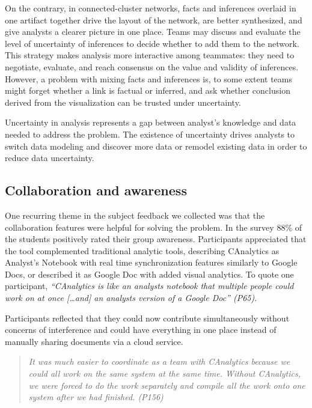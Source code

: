 

On the contrary, in connected-cluster networks, facts and inferences overlaid in one artifact together drive the layout of the
network, are better synthesized, and give analysts a clearer picture in one place. Teams may discuss and evaluate the level of uncertainty of inferences to decide whether to add them to the
network. This strategy makes analysis more interactive among teammates:
they need to negotiate, evaluate, and reach consensus on the value and
validity of inferences. However, a problem with mixing facts and inferences is, to some extent teams might forget whether a
link is factual or inferred, and ask whether conclusion derived
from the visualization can be trusted under uncertainty.

Uncertainty in analysis represents a gap between analyst's knowledge and data needed to address the problem. The existence of uncertainty drives analysts to switch data modeling and discover more data or remodel existing data in order to reduce data uncertainty.

\subsection{Collaboration and
awareness}\label{collaboration-and-awareness}

One recurring theme in the subject feedback we collected was that the
collaboration features were helpful for solving the problem. In the survey
88\% of the students positively rated their
group awareness. Participants appreciated that the tool complemented
traditional analytic tools, describing CAnalytics as Analyst's Notebook with real time
synchronization features similarly to Google Docs, or described it as Google Doc with added visual analytics. To quote one participant,
\emph{``CAnalytics is like an analysts notebook that multiple people
could work on at once {[}\ldots{}and{]} an analysts version of a Google
Doc'' (P65)}.

Participants reflected that they could now contribute simultaneously
without concerns of interference and could
have everything in one place instead of manually sharing documents via a
cloud service.

\begin{quote}
\emph{It was much easier to coordinate as a team with CAnalytics because we
could all work on the same system at the same time. Without CAnalytics,
we were forced to do the work separately and compile all the work onto
one system after we had finished. (P156)}
\end{quote}

